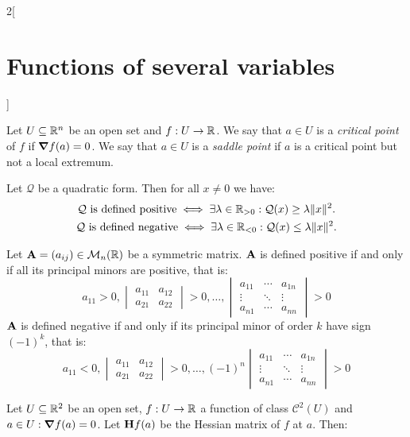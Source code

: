 \documentclass[../../../main_math.tex]{subfiles}
\begin{document}
\begin{multicols}{2}[\section{Functions of several variables}]
  \begin{definition}
    Let $U\subseteq\mathbb{R}^n$ be an open set and $f:U\rightarrow\mathbb{R} $. We say that $a\in U$ is a \emph{critical point} of $f$ if $\grad f(a)=0$. We say that $a\in U$ is a \emph{saddle point} if $a$ is a critical point but not a local extremum.
  \end{definition}
  \begin{theorem}
    Let $\mathcal{Q}$ be a quadratic form. Then for all $x\ne 0$ we have:
    \begin{gather*}
      \mathcal{Q}\text{ is defined positive}\iff\exists\lambda\in\mathbb{R}_{>0}:\mathcal{Q}(x)\geq\lambda\|x\|^2.\\
      \mathcal{Q}\text{ is defined negative}\iff\exists\lambda\in\mathbb{R}_{<0}:\mathcal{Q}(x)\leq\lambda\|x\|^2.
    \end{gather*}
  \end{theorem}
  \begin{proposition}
    Let $\boldsymbol{\mathrm{A}}=(a_{ij})\in\mathcal{M}_n(\mathbb{R} )$ be a symmetric matrix. $\boldsymbol{\mathrm{A}}$ is defined positive if and only if all its principal minors are positive, that is:
    $$a_{11}>0,
      \begin{vmatrix}
        a_{11} & a_{12} \\
        a_{21} & a_{22}\end{vmatrix}>0,\ldots,
      \begin{vmatrix}
        a_{11} & \cdots & a_{1n} \\
        \vdots & \ddots & \vdots \\
        a_{n1} & \cdots & a_{nn}
      \end{vmatrix}>0$$
    $\boldsymbol{\mathrm{A}}$ is defined negative if and only if its principal minor of order $k$ have sign $(-1)^k$, that is:
    $$a_{11}<0,
      \begin{vmatrix}
        a_{11} & a_{12} \\
        a_{21} & a_{22}
      \end{vmatrix}>0,\ldots,
      (-1)^n\begin{vmatrix}
        a_{11} & \cdots & a_{1n} \\
        \vdots & \ddots & \vdots \\
        a_{n1} & \cdots & a_{nn}
      \end{vmatrix}>0$$
  \end{proposition}
  \begin{theorem}
    Let $U\subseteq\mathbb{R}^2$ be an open set, $f:U\rightarrow\mathbb{R} $ a function of class $\mathcal{C}^2(U)$ and $a\in U:\grad f(a)=0$. Let $\boldsymbol{\mathrm{H}}f(a)$ be the Hessian matrix of $f$ at $a$. Then:

\end{theorem}
\end{multicols}
\end{document}
